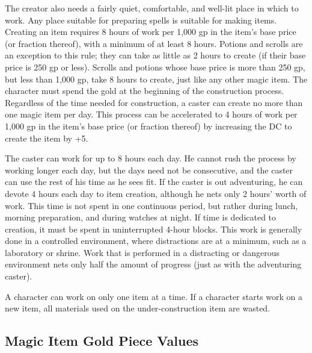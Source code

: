 The creator also needs a fairly quiet, comfortable, and well-lit place in which to work. Any place suitable for preparing spells is suitable for making items. Creating an item requires 8 hours of work per 1,000 gp in the item's base price (or fraction thereof), with a minimum of at least 8 hours. Potions and scrolls are an exception to this rule; they can take as little as 2 hours to create (if their base price is 250 gp or less). Scrolls and potions whose base price is more than 250 gp, but less than 1,000 gp, take 8 hours to create, just like any other magic item. The character must spend the gold at the beginning of the construction process. Regardless of the time needed for construction, a caster can create no more than one magic item per day. This process can be accelerated to 4 hours of work per 1,000 gp in the item's base price (or fraction thereof) by increasing the DC to create the item by +5.
				
The caster can work for up to 8 hours each day. He cannot rush the process by working longer each day, but the days need not be consecutive, and the caster can use the rest of his time as he sees fit. If the caster is out adventuring, he can devote 4 hours each day to item creation, although he nets only 2 hours' worth of work. This time is not spent in one continuous period, but rather during lunch, morning preparation, and during watches at night. If time is dedicated to creation, it must be spent in uninterrupted 4-hour blocks. This work is generally done in a controlled environment, where distractions are at a minimum, such as a laboratory or shrine. Work that is performed in a distracting or dangerous environment nets only half the amount of progress (just as with the adventuring caster).
				
A character can work on only one item at a time. If a character starts work on a new item, all materials used on the under-construction item are wasted.
				
\subsection{Magic Item Gold Piece Values}

